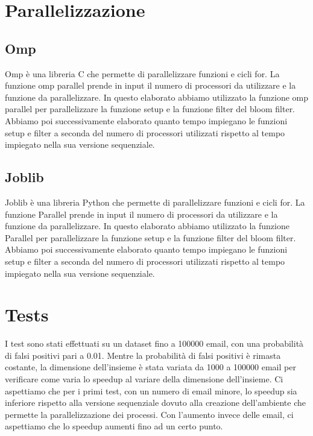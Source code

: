 \documentclass[11pt]{article}
\begin{document}
    \section{Parallelizzazione}\label{sec:parallelizazzione}
    \subsection{Omp}\label{subsec:omp}
    Omp è una libreria C che permette di parallelizzare funzioni e cicli for.
    La funzione omp parallel prende in input il numero di processori da utilizzare e la funzione da parallelizzare.
    In questo elaborato abbiamo utilizzato la funzione omp parallel per parallelizzare la funzione setup e la funzione filter del bloom filter.
    Abbiamo poi successivamente elaborato quanto tempo impiegano le funzioni setup e filter a seconda del numero di processori utilizzati rispetto al tempo impiegato nella sua versione sequenziale.
    \subsection{Joblib}\label{subsec:joblib}
    Joblib è una libreria Python che permette di parallelizzare funzioni e cicli for.
    La funzione Parallel prende in input il numero di processori da utilizzare e la funzione da parallelizzare.
    In questo elaborato abbiamo utilizzato la funzione Parallel per parallelizzare la funzione setup e la funzione filter del bloom filter.
    Abbiamo poi successivamente elaborato quanto tempo impiegano le funzioni setup e filter a seconda del numero di processori utilizzati rispetto al tempo impiegato nella sua versione sequenziale.
    \clearpage

    \section{Tests}\label{sec:tests}
    I test sono stati effettuati su un dataset fino a 100000 email, con una probabilità di falsi positivi pari a 0.01.
    Mentre la probabilità di falsi positivi è rimasta costante, la dimensione dell'insieme è stata variata da 1000 a 100000 email per verificare come varia lo speedup al variare della dimensione dell'insieme.
    Ci aspettiamo che per i primi test, con un numero di email minore, lo speedup sia inferiore rispetto alla versione sequenziale dovuto alla creazione dell'ambiente che permette la parallelizzazione dei processi.
    Con l'aumento invece delle email, ci aspettiamo che lo speedup aumenti fino ad un certo punto.
\end{document}
